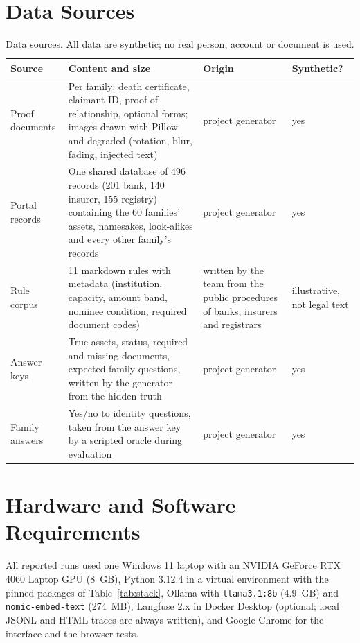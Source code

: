 \documentclass[12pt,a4paper,oneside]{report}
\begin{document}
\section{Data Sources}\label{sec:data}
\begin{table}[H]
\centering\small{}
\caption[Data sources]{Data sources. All data are synthetic; no real person, account or document is used.}\label{tab:datasrc}
\renewcommand{\arraystretch}{1.15}
\begin{tabularx}{\linewidth}{@{}p{3.1cm}Xp{2.3cm}p{1.9cm}@{}}
\toprule
\textbf{Source} & \textbf{Content and size} & \textbf{Origin} & \textbf{Synthetic?} \\ \midrule
Proof documents & Per family: death certificate, claimant ID, proof of relationship, optional forms; images drawn with Pillow and degraded (rotation, blur, fading, injected text) & project generator & yes \\
Portal records & One shared database of 496 records (201 bank, 140 insurer, 155 registry) containing the 60 families' assets, namesakes, look-alikes and every other family's records & project generator & yes \\
Rule corpus & 11 markdown rules with metadata (institution, capacity, amount band, nominee condition, required document codes) & written by the team from the public procedures of banks, insurers and registrars & illustrative, not legal text \\
Answer keys & True assets, status, required and missing documents, expected family questions, written by the generator from the hidden truth & project generator & yes \\
Family answers & Yes/no to identity questions, taken from the answer key by a scripted oracle during evaluation & project generator & yes \\ \bottomrule
\end{tabularx}
\end{table}

\section{Hardware and Software Requirements}
All reported runs used one Windows 11 laptop with an NVIDIA GeForce RTX 4060 Laptop GPU (8~GB), Python 3.12.4 in a virtual environment with the pinned packages of Table~\ref{tab:stack}, Ollama with \texttt{llama3.1:8b} (4.9~GB) and \texttt{nomic-embed-text} (274~MB), Langfuse 2.x in Docker Desktop (optional; local JSONL and HTML traces are always written), and Google Chrome for the interface and the browser tests.
\end{document}
